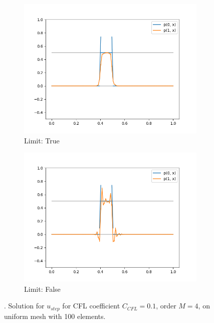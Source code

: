 \begin{figure}[h!]
	\centering
	\begin{subfigure}{.5\textwidth}
		\centering
		\includegraphics[width=\linewidth]{../figs/sols/adv1d-sol-o2h100-limit}
		\caption{Limit: True}
	\end{subfigure}%
	\begin{subfigure}{.5\textwidth}
		\centering
		\includegraphics[width=\linewidth]{../figs/sols/adv1d-sol-o2h100-nolimit}
		\caption{Limit: False}
	\end{subfigure}
	\caption{. Solution for $u_{step}$ for CFL coefficient $C_{CFL}=0.1$, 
	order $M = 4$, on uniform mesh with 100 elements.}
	\label{fig:sol_adv1D}
\end{figure}

